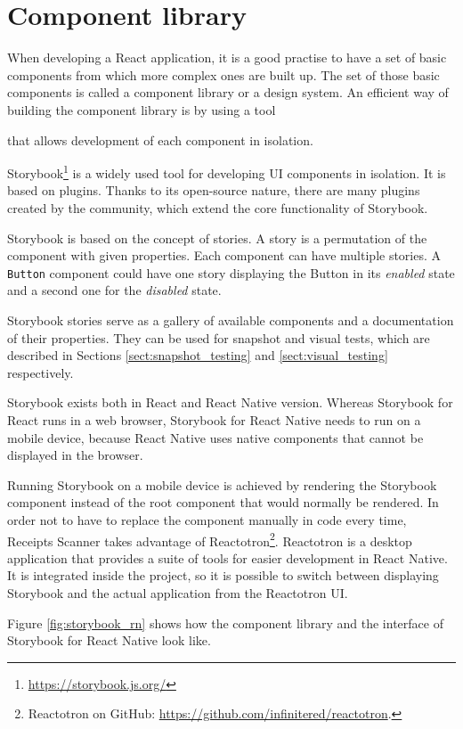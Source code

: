 \documentclass[
  digital, %
  table,   %
  oneside, %
  lof,     %
  lot,     %
]{fithesis3}
\begin{document}
\section{Component library}
\label{sec:component_library}
When developing a React application, it is a good practise to have a set of basic components from which more complex ones are built up. The set of those basic components is called a component library or a design system. An efficient way of building the component library is by using a tool


that allows development of each component in isolation.

Storybook\footnote{\url{https://storybook.js.org/}} is a widely used tool for developing UI components in isolation. It is based on plugins. Thanks to its open-source nature, there are many plugins created by the community, which extend the core functionality of Storybook.

Storybook is based on the concept of stories. A story is a permutation of the component with given properties. Each component can have multiple stories. A \texttt{Button} component could have one story displaying the Button in its \textit{enabled} state and a second one for the \textit{disabled} state.

Storybook stories serve as a gallery of available components and a documentation of their properties. They can be used for snapshot and visual tests, which are described in Sections \ref{sect:snapshot_testing} and \ref{sect:visual_testing} respectively.

Storybook exists both in React and React Native version. 
Whereas Storybook for React runs in a web browser, Storybook for React Native needs to run on a mobile device, because React Native uses native components that cannot be displayed in the browser. 

\label{phantom:reactotron}
Running Storybook on a mobile device is achieved by rendering the Storybook component instead of the root component that would normally be rendered. In order not to have to replace the component manually in code every time, Receipts Scanner takes advantage of Reactotron\footnote{Reactotron on GitHub: \url{https://github.com/infinitered/reactotron}.}. Reactotron is a desktop application that provides a suite of tools for easier development in React Native. It is integrated inside the project, so it is possible to switch between displaying Storybook and the actual application from the Reactotron UI. 

Figure \ref{fig:storybook_rn} shows how the component library and the interface of Storybook for React Native look like.
\end{document}
